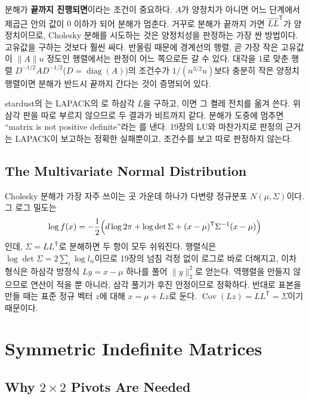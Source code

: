 분해가 \textbf{끝까지 진행되면}이라는 조건이 중요하다. $A$가 양정치가 아니면 어느 단계에서 제곱근 안의 값이 $0$ 이하가 되어 분해가 멈춘다. 거꾸로 분해가 끝까지 가면 $\hat L\hat L^{\mathsf T}$가 양정치이므로, Cholesky 분해를 시도하는 것은 양정치성을 판정하는 가장 싼 방법이다. 고유값을 구하는 것보다 훨씬 싸다. 반올림 때문에 경계선의 행렬, 곧 가장 작은 고유값이 $\|A\|u$ 정도인 행렬에서는 판정이 어느 쪽으로든 갈 수 있다. 대각을 $1$로 맞춘 행렬 $D^{-1/2}AD^{-1/2}$($D=\operatorname{diag}(A)$)의 조건수가 $1/(n^{3/2}u)$보다 충분히 작은 양정치 행렬이면 분해가 반드시 끝까지 간다는 것이 증명되어 있다\cite{higham2002accuracy}.

\begin{instardust}
stardust의 는 LAPACK의 로 하삼각 $L$을 구하고, 이면 그 켤레 전치를 옮겨 쓴다. 위삼각 판을 따로 부르지 않으므로 두 결과가 비트까지 같다. 분해가 도중에 멈추면 ``matrix is not positive definite''라는 를 낸다. 19장의 LU와 마찬가지로 판정의 근거는 LAPACK이 보고하는 정확한 실패뿐이고, 조건수를 보고 따로 판정하지 않는다.
\end{instardust}

\subsection{The Multivariate Normal Distribution}

Cholesky 분해가 가장 자주 쓰이는 곳 가운데 하나가 다변량 정규분포 $N(\mu,\Sigma)$이다. 그 로그 밀도는
\[
\log f(x)=-\frac12\Bigl(d\log2\pi+\log\det\Sigma+(x-\mu)^{\mathsf T}\Sigma^{-1}(x-\mu)\Bigr)
\]
인데, $\Sigma=LL^{\mathsf T}$로 분해하면 두 항이 모두 쉬워진다. 행렬식은 $\log\det\Sigma=2\sum_i\log l_{ii}$이므로 19장의 넘침 걱정 없이 로그로 바로 더해지고, 이차 형식은 하삼각 방정식 $Ly=x-\mu$ 하나를 풀어 $\|y\|_2^2$로 얻는다. 역행렬을 만들지 않으므로 연산이 적을 뿐 아니라, 삼각 풀기가 후진 안정이므로 정확하다. 반대로 표본을 만들 때는 표준 정규 벡터 $z$에 대해 $x=\mu+Lz$로 둔다. $\operatorname{Cov}(Lz)=LL^{\mathsf T}=\Sigma$이기 때문이다.

\section{Symmetric Indefinite Matrices}
\label{sec:indefinite}

\subsection{Why $2\times2$ Pivots Are Needed}


